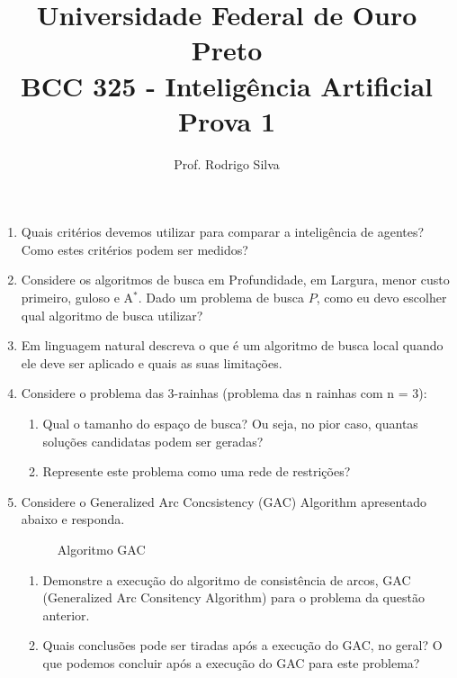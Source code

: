 \documentclass{article}
\title{\vspace{-2 cm}Universidade Federal de Ouro Preto \\ BCC 325 - Inteligência Artificial \\ Prova 1}
\author{Prof. Rodrigo Silva}
\date{}
\begin{document}
\maketitle


\begin{enumerate}

\item Quais critérios devemos utilizar para comparar a inteligência de agentes? Como estes critérios podem ser medidos? 

\item Considere os algoritmos de busca em Profundidade, em Largura, menor custo primeiro, guloso e A$^*$. Dado um problema de busca $P$, como eu devo escolher qual algoritmo de busca utilizar?

\item Em linguagem natural descreva o que é um algoritmo de busca local quando ele deve ser aplicado e quais as suas limitações.

\item Considere o problema das 3-rainhas (problema das n rainhas com n = 3):

\begin{enumerate}
    \item Qual o tamanho do espaço de busca? Ou seja, no pior caso, quantas soluções candidatas podem ser geradas?
    \item Represente este problema como uma rede de restrições?
\end{enumerate}

\item Considere o Generalized Arc Concsistency (GAC) Algorithm apresentado abaixo e responda.

\begin{figure}[!ht]
    
    \caption{Algoritmo GAC}
\end{figure}

\begin{enumerate}
    \item Demonstre a execução do algoritmo de consistência de arcos, GAC (Generalized Arc Consitency Algorithm) para o problema da questão anterior.
    \item Quais conclusões pode ser tiradas após a execução do GAC, no geral? O que podemos concluir após a execução do GAC para este problema?
\end{enumerate}


\end{enumerate}
\end{document}
